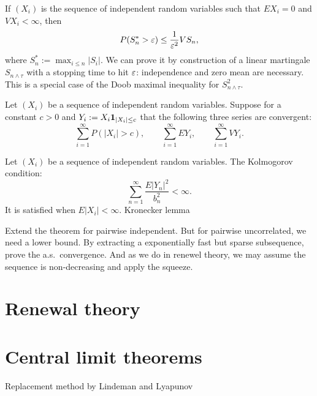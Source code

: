 \documentclass{../../large}
\begin{document}
\begin{prb}
If $(X_i)$ is the sequence of independent random variables such that $EX_i=0$ and $VX_i<\infty$, then
\[P(S^*_n>\varepsilon)\le\frac1{\varepsilon^2}VS_n,\]
where $S^*_n:=\max_{i\le n}|S_i|$.
We can prove it by construction of a linear martingale $S_{n\wedge\tau}$ with a stopping time to hit $\varepsilon$: independence and zero mean are necessary.
This is a special case of the Doob maximal inequality for $S_{n\wedge\tau}^2$.
\end{prb}


\begin{prb}
Let $(X_i)$ be a sequence of independent random variables.
Suppose for a constant $c>0$ and $Y_i:=X_i\mathbf{1}_{|X_i|\le c}$  that the following three series are convergent:
\[\sum_{i=1}^\infty P(|X_i|>c),\qquad\sum_{i=1}^\infty EY_i,\qquad\sum_{i=1}^\infty VY_i.\]
\end{prb}

\begin{prb}
Let $(X_i)$ be a sequence of independent random variables.
The Kolmogorov condition:
\[\sum_{n=1}^\infty\frac{E|Y_n|^2}{b_n^2}<\infty.\]
It is satisfied when $E|X_i|<\infty$.
Kronecker lemma
\end{prb}


\begin{prb}
Extend the theorem for pairwise independent.
But for pairwise uncorrelated, we need a lower bound.
By extracting a exponentially fast but sparse subsequence, prove the a.s.~convergence.
And as we do in renewel theory, we may assume the sequence is non-decreasing and apply the squeeze.
\end{prb}

\section{Renewal theory}





\section{Central limit theorems}

\begin{prb}
Replacement method by Lindeman and Lyapunov
\end{prb}
\end{document}
